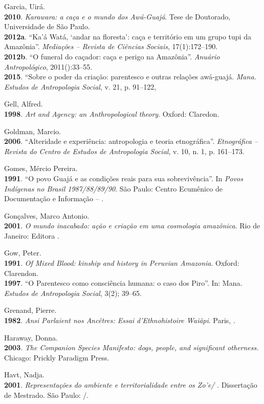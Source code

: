\begin{Parskip}
Garcia, Uirá.\\
\textbf{2010}. \emph{Karawara: a caça e o mundo dos Awá-Guajá}. Tese de
Doutorado, Universidade de São Paulo.\\
\textbf{2012a}. ``Ka'á Watá, `andar na floresta': caça e território em
um grupo tupi da Amazônia''. \emph{Mediações -- Revista de Ciências
Sociais}, 17(1):172--190.\\
\textbf{2012b}. ``O funeral do caçador: caça e perigo na Amazônia''.
\emph{Anuário Antropológico}, 2011():33--55.\\
\textbf{2015}. ``Sobre o poder da criação: parentesco e outras relações
awá-guajá. \emph{Mana. Estudos de Antropologia Social}, v. 21, p.
91--122,

Gell, Alfred.\\
\textbf{1998}. \emph{Art and Agency: an Anthropological theory}. Oxford:
Claredon.

Goldman, Marcio.\\
\textbf{2006}. ``Alteridade e experiência: antropologia e teoria
etnográfica''. \emph{Etnográfica -- Revista do Centro de Estudos de
Antropologia Social}, v. 10, n. 1, p. 161--173.

Gomes, Mércio Pereira.\\
\textbf{1991}. ``O povo Guajá e as condições reais para sua
sobrevivência''. In \emph{Povos Indígenas no Brasil 1987/88/89/90}. São
Paulo: Centro Ecumênico de Documentação e Informação -- .

Gonçalves, Marco Antonio.\\
\textbf{2001}. \emph{O mundo inacabado: ação e criação em uma cosmologia
amazônica}. Rio de Janeiro: Editora .

Gow, Peter.\\
\textbf{1991}. \emph{Of Mixed Blood: kinship and history in Peruvian
Amazonia}. Oxford: Clarendon.\\
\textbf{1997}. ``O Parentesco como consciência humana: o caso dos Piro''.
In: Mana. \emph{Estudos de Antropologia Social}, 3(2); 39--65.

Grenand, Pierre.\\
\textbf{1982}. \emph{Ansi Parlaient nos Ancêtres: Essai d'Ethnohistoire
Waiãpi}. Paris, .

Haraway, Donna.\\
\textbf{2003}. \emph{The Companion Species Manifesto: dogs, people, and
significant otherness.} Chicago: Prickly Paradigm Press.

Havt, Nadja.\\
\textbf{2001}. \emph{Representações do ambiente e territorialidade entre
os Zo'e/ }. Dissertação de Mestrado. São Paulo: /.


\end{Parskip}
